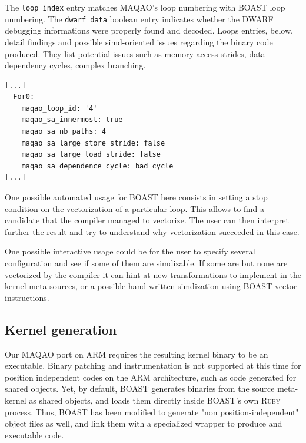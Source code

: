 \documentclass[11pt, a4paper, twoside]{montblanc2}
\def\ruby{\textsc{Ruby}\xspace}
\begin{document}
The \verb|loop_index| entry matches MAQAO's loop numbering with BOAST loop
numbering. The \verb|dwarf_data| boolean entry indicates whether the DWARF
debugging informations were properly found and decoded. Loops entries, below, detail
findings and possible simd-oriented issues regarding the binary code produced.
They list potential issues such as memory access strides, data dependency
cycles, complex branching.

\begin{verbatim}
[...]
  For0:
    maqao_loop_id: '4'
    maqao_sa_innermost: true
    maqao_sa_nb_paths: 4
    maqao_sa_large_store_stride: false
    maqao_sa_large_load_stride: false
    maqao_sa_dependence_cycle: bad_cycle
[...]
\end{verbatim}

One possible automated usage for BOAST here consists in setting a stop
condition on the vectorization of a particular loop. This allows to find a
candidate that the compiler managed to vectorize. The user can then interpret
further the result and try to understand why vectorization succeeded in this
case.

One possible interactive usage could be for the user to specify several
configuration and see if some of them are simdizable. If some are but none are
vectorized by the compiler it can hint at new transformations to implement in
the kernel meta-sources, or a possible hand written simdization using BOAST
vector instructions.

\subsection{Kernel generation}

Our MAQAO port on ARM requires the resulting kernel binary to be an executable.
Binary patching and instrumentation is not supported at this time for position
independent codes on the ARM architecture, such as code generated for shared
objects. Yet, by default, BOAST generates binaries from the source meta-kernel
as shared objects, and loads them directly inside BOAST's own \ruby process.
Thus, BOAST has been modified to generate "non position-independent" object
files as well, and link them with a specialized wrapper to produce and
executable code.
\end{document}
